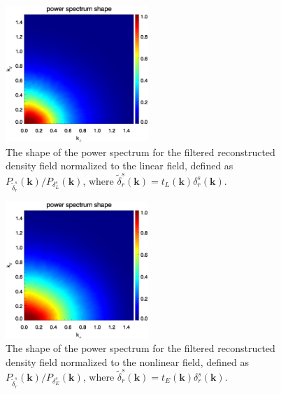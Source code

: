 \documentclass[aps,prx,twocolumn,superscriptaddress,groupedaddress,nofootinbib,amsfont]{revtex4}  %
\newcommand{\bmk}{\bm{k}}
\begin{document}
\begin{figure}[tbp]
\begin{center}
\includegraphics[width=0.48\textwidth]{0.000anishape_deltaRs-tfxLs_4x.eps}
\end{center}
\vspace{-0.7cm}
\caption{The shape of the power spectrum for the filtered reconstructed density 
field normalized to the linear field, defined as 
$P_{\tilde{\delta}_r^s}(\bmk)/P_{\delta_L^s}(\bmk)$, where 
$\tilde{\delta}_r^s(\bmk)=t_L(\bmk)\delta_r^s(\bmk)$.}
\label{fig:shape_Ls}
\end{figure}

\begin{figure}[tbp]
\begin{center}
\includegraphics[width=0.48\textwidth]{0.000anishape_deltaRs-tfxEs_4x.eps}
\end{center}
\vspace{-0.7cm}
\caption{The shape of the power spectrum for the filtered reconstructed density
field normalized to the nonlinear field, defined as
$P_{\tilde{\delta}_r^s}(\bmk)/P_{\delta_E^s}(\bmk)$, where 
$\tilde{\delta}_r^s(\bmk)=t_E(\bmk)\delta_r^s(\bmk)$.}
\label{fig:shape_Es}
\end{figure}
\end{document}

